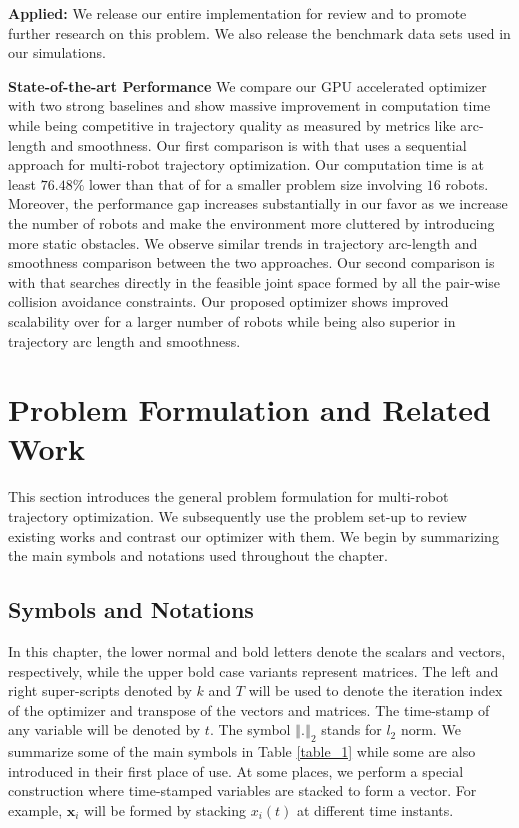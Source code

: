 \noindent \textbf{Applied:} We release our entire implementation for review and to promote further research on this problem. We also release the benchmark data sets used in our simulations.

\noindent \textbf{State-of-the-art Performance} We compare our GPU accelerated optimizer with two strong baselines  \citep{park2020efficient,aks_ral21} and show massive improvement in computation time while being competitive in trajectory quality as measured by metrics like arc-length and smoothness. Our first comparison is with \citep{park2020efficient} that uses a sequential approach for multi-robot trajectory optimization. Our computation time is at least $76.48\%$ lower than that of \citep{park2020efficient} for a smaller problem size involving $16$ robots. Moreover, the performance gap increases substantially in our favor as we increase the number of robots and make the environment more cluttered by introducing more static obstacles. We observe similar trends in trajectory arc-length and smoothness comparison between the two approaches. Our second comparison is with \citep{aks_ral21} that searches directly in the feasible joint space formed by all the pair-wise collision avoidance constraints. Our proposed optimizer shows improved scalability over \citep{aks_ral21} for a larger number of robots while being also superior in trajectory arc length and smoothness.

\section{Problem Formulation and Related Work}
This section introduces the general problem formulation for multi-robot trajectory optimization. We subsequently use the problem set-up to review existing works and contrast our optimizer with them. We begin by summarizing the main symbols and notations used throughout the chapter.

\subsection{Symbols and Notations}
\noindent In this chapter, the lower normal and bold letters denote the scalars and vectors, respectively, while the upper bold case variants represent matrices. The left and right super-scripts denoted by $k$ and $T$ will be used to denote the iteration index of the optimizer and transpose of the vectors and matrices. The time-stamp of any variable will be denoted by $t$. The symbol $\left\Vert \textbf{.} \right\Vert_{2}$ stands for $l_{2}$ norm. We summarize some of the main symbols in Table \eqref{table_1} while some are also introduced in their first place of use. At some places, we perform a special construction where time-stamped variables are stacked to form a vector. For example, $\textbf{x}_i$ will be formed by stacking $x_i(t)$ at different time instants.


